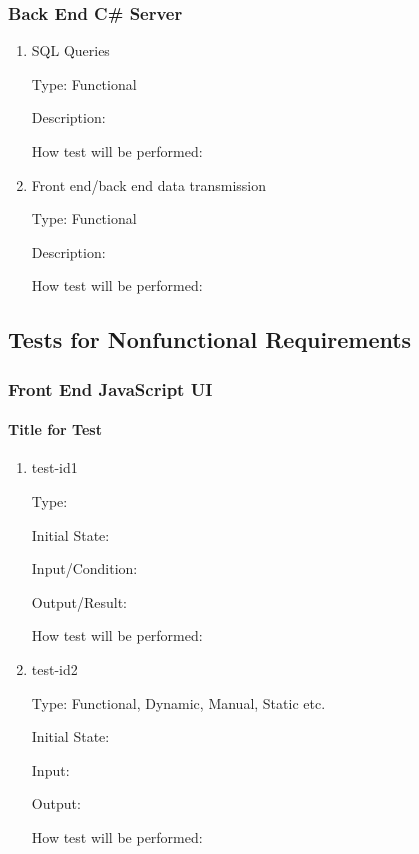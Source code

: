 \documentclass[12pt, titlepage]{article}
\begin{document}
\subsubsection{Back End C\# Server}

\begin{enumerate}

\item{SQL Queries\\}

Type: Functional
					
Description: 

How test will be performed: 

\item{Front end/back end data transmission\\}

Type: Functional
					
Description: 

How test will be performed: 

\end{enumerate}

\subsection{Tests for Nonfunctional Requirements}

\subsubsection{Front End JavaScript UI}
		
\paragraph{Title for Test}

\begin{enumerate}

\item{test-id1\\}

Type: 
					
Initial State: 
					
Input/Condition: 
					
Output/Result: 
					
How test will be performed: 
					
\item{test-id2\\}

Type: Functional, Dynamic, Manual, Static etc.
					
Initial State: 
					
Input: 
					
Output: 
					
How test will be performed: 

\end{enumerate}
\end{document}
